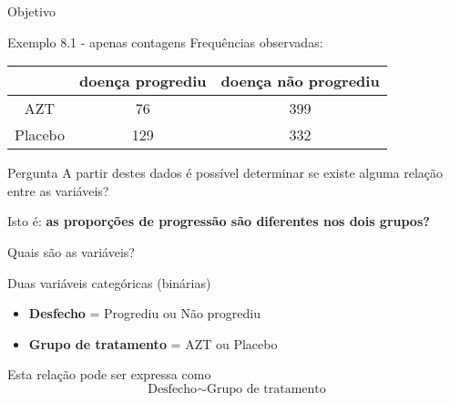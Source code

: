 \documentclass{beamer}
\begin{document}

\begin{frame}{\scriptsize Objetivo}
  \begin{exampleblock}{Exemplo 8.1 - apenas contagens}
    \footnotesize
    Frequências observadas:
    \begin{tabular}{c|c|c}
      & doença progrediu & doença não progrediu\\
      \hline
      AZT & 76 & 399 \\
      \hline
      Placebo & 129 & 332 \\
    \end{tabular}
  \end{exampleblock}
  \begin{block}{Pergunta}
    \footnotesize
    A partir destes dados é possível determinar se existe alguma relação entre as variáveis?

    Isto é: {\bf as proporções de progressão são diferentes nos dois grupos?}
  \end{block}
\end{frame}

\begin{frame}{\scriptsize Quais são as variáveis?}

  \begin{block}{Duas variáveis categóricas (binárias)}
    \footnotesize
  \begin{itemize}
    \footnotesize
  \item {\bf Desfecho} = Progrediu ou Não progrediu
  \item {\bf Grupo de tratamento} = AZT ou Placebo
  \end{itemize}
  \end{block}
  \begin{block}{Esta relação pode ser expressa como}
    \footnotesize
    \begin{displaymath}
      \text{Desfecho} \sim \text{Grupo de tratamento}
    \end{displaymath}
  \end{block}
\end{frame}
\end{document}
